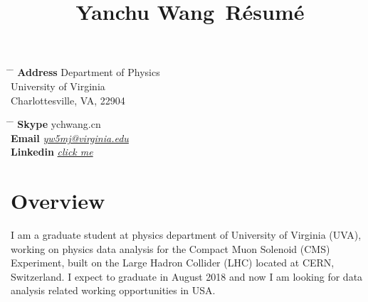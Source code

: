 \documentclass[10pt]{article} %
\begin{document}

\title{Yanchu Wang\, \small{Résumé}} %


\parbox{0.5\textwidth}{ %
\begin{tabbing} %
\hspace{3cm} \= \hspace{4cm} \= \kill %
{\bf Address} \> Department of Physics \\
\> University of Virginia\\ %
\> Charlottesville, VA, 22904 \\ %

\end{tabbing}}
\hfill %
\parbox{0.5\textwidth}{ %
\begin{tabbing} %
\hspace{3cm} \= \hspace{4cm} \= \kill %
{\bf Skype} \> ychwang.cn \\ %
{\bf Email} \> \href{mailto:yw5mj@virginia.edu}{\textit{yw5mj@virginia.edu}} \\ %
{\bf Linkedin} \> \href{https://www.linkedin.com/in/yanchu-wang-46040289/}{\textit{click me}} \\ %
\end{tabbing}}


\section{Overview}

I am a graduate student at physics department of University of Virginia (UVA), working on physics data analysis for the Compact Muon Solenoid (CMS) Experiment, built on the Large Hadron Collider (LHC) located at CERN, Switzerland. I expect to graduate in August 2018 and now I am looking for data analysis related working opportunities in USA.
\end{document}
